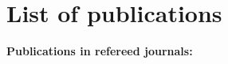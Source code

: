 \chapter{List of publications}\label{ch:publications}

\begin{large}
\textbf{Publications in refereed journals:}
\end{large}







\cleardoublepage

